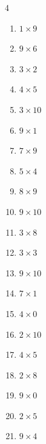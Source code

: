 \begin{multicols}{4}
\begin{enumerate}
  \item $1\times 9$
        \phantom{$=9$}

  \item $9\times 6$
        \phantom{$=54$}

  \item $3\times 2$
        \phantom{$=6$}

  \item $4\times 5$
        \phantom{$=20$}

  \item $3\times 10$
        \phantom{$=30$}

  \item $9\times 1$
        \phantom{$=9$}

  \item $7\times 9$
        \phantom{$=63$}

  \item $5\times 4$
        \phantom{$=20$}

\columnbreak %

  \item $8\times 9$
        \phantom{$=72$}

  \item $9\times 10$
        \phantom{$=90$}

  \item $3\times 8$
        \phantom{$=24$}

  \item $3\times 3$
        \phantom{$=9$}

  \item $9\times 10$
        \phantom{$=90$}

  \item $7\times 1$
        \phantom{$=7$}

  \item $4\times 0$
        \phantom{$=0$}

  \item $2\times 10$
        \phantom{$=20$}

  \item $4\times 5$
        \phantom{$=20$}

  \item $2\times 8$
        \phantom{$=16$}

  \item $9\times 0$
        \phantom{$=0$}

  \item $2\times 5$
        \phantom{$=10$}

  \item $9\times 4$
        \phantom{$=36$}


\end{enumerate}
\end{multicols}
